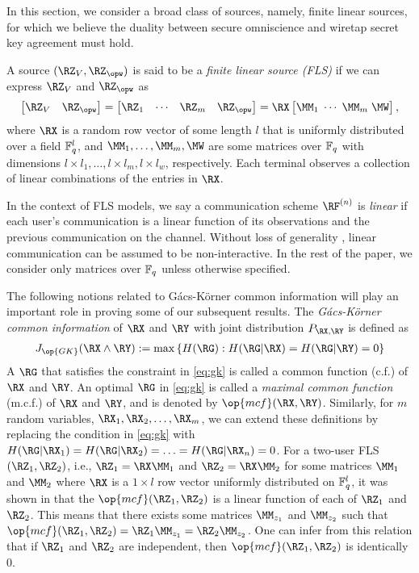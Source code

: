 In this section, we  consider  a  broad  class  of  sources,  namely, finite linear sources, for which we believe the duality between secure omniscience and wiretap secret key agreement must hold. 

\begin{definition}
A source $(\RZ_V, \RZ_{\opw})$ is said to be a \textit{finite linear source (FLS)} if we can express $\RZ_V$ and $\RZ_{\opw}$ as
$$\bM \RZ_V & \RZ_{\opw}\eM=\bM \RZ_1 & \cdots& \RZ_m & \RZ_{\opw}\eM=\RX \bM \MM_1\;\cdots\;\MM_m \; \MW \eM,$$
where  $\RX$ is a random row vector of some length $l$ that is uniformly distributed over a field $\mathbb{F}_q^l$, and $\MM_1, \ldots,\MM_m, \MW$ are some matrices over $\mathbb{F}_q$ with dimensions $l \times l_1, \ldots ,l \times l_m, l \times l_w$, respectively. Each terminal observes a collection of linear combinations of the entries in $\RX$. 
\end{definition} 

In the context of FLS models, we say a communication scheme $\RF^{(n)}$ is \emph{linear} if each user's communication is a linear function of its observations and the previous communication on the channel. Without loss of generality \cite[Sec.~II]{chan19oneshot}, linear communication can be assumed to be non-interactive.  In the rest of the paper, we consider only matrices over $\mathbb{F}_q$ unless otherwise specified.

The following notions related to G\'{a}cs-K\"{o}rner common information will play an important role in proving some of our subsequent results. The \emph{ G\'{a}cs-K\"{o}rner common information} of  $\RX$ and $\RY$ with joint distribution $P_{\RX,\RY}$ is defined as
\begin{align}\label{eq:gk}
 J_{\op{GK}}(\RX \wedge \RY) := \max \left\lbrace H(\RG) : H(\RG|\RX)=H(\RG|\RY) =0 \right\rbrace
\end{align}
A $\RG$  that satisfies the constraint in \eqref{eq:gk} is called a common function (c.f.) of $\RX$ and $\RY$. An optimal $\RG$ in \eqref{eq:gk} is called a \emph{maximal common function} (m.c.f.) of $\RX$ and $\RY$, and is denoted by $\op{mcf}(\RX, \RY)$. Similarly, for $m$ random variables, $\RX_1, \RX_2, \ldots, \RX_m$,  we can extend these definitions by replacing the condition in \eqref{eq:gk} with $H(\RG|\RX_1)=H(\RG|\RX_2)=\ldots=H(\RG|\RX_n)=0$. For a two-user FLS $(\RZ_1, \RZ_2)$, i.e., $\RZ_1 = \RX \MM_1$ and $\RZ_2=\RX \MM_2$ for some matrices $\MM_1$ and $\MM_2$ where $\RX$ is a $1 \times l$ row vector   uniformly distributed on $\mathbb{F}_q^l$, it was shown in \cite{chan18zero} that the $\op{mcf}(\RZ_1, \RZ_2)$ is a linear function of each of $\RZ_1$ and $\RZ_2$. This means that there exists some matrices $\MM_{z_1}$ and $\MM_{z_2}$ such that $\op{mcf}(\RZ_1, \RZ_2) = \RZ_1 \MM_{z_1}=\RZ_2 \MM_{z_2}$. One can infer from this relation that if $\RZ_1$ and $\RZ_2$ are independent, then $\op{mcf}(\RZ_1, \RZ_2)$ is identically $0$.

